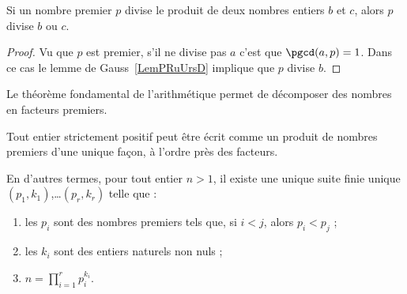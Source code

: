 \begin{lemma}       \label{LemAXINooOeuMJZ}
    Si un nombre premier $p$ divise le produit de deux nombres entiers $b$ et $c$, alors $p$ divise $b$ ou $c$.
\end{lemma}

\begin{proof}
    Vu que \( p\) est premier, s'il ne divise pas \( a\) c'est que \( \pgcd(a,p)=1\). Dans ce cas le lemme de Gauss~\ref{LemPRuUrsD} implique que \( p\) divise \( b\).
\end{proof}

Le théorème fondamental de l'arithmétique permet de décomposer des nombres en facteurs premiers.

\begin{theorem}        \label{ThoAJFJooAveRvY}
    Tout entier strictement positif peut être écrit comme un produit de nombres premiers d'une unique façon, à l'ordre près des facteurs.

    En d'autres termes, pour tout entier \( n>1\), il existe une unique suite finie unique $(p_1, k_1)$,\ldots $(p_r, k_r)$ telle que :
    \begin{enumerate}
        \item
    les \( p_i\) sont des nombres premiers tels que, si $i < j$, alors $p_i < p_j$ ;
    \item
    les \( k_i\) sont des entiers naturels non nuls ;
    \item
        \( n=\prod_{i=1}^rp_i^{k_i}\).
    \end{enumerate}
\end{theorem}


